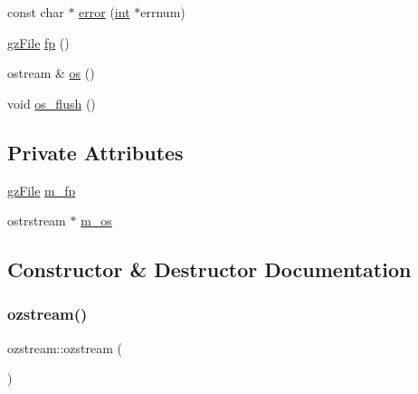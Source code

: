 \begin{DoxyCompactItemize}
\item 
const char $\ast$ \mbox{\hyperlink{classozstream_a189c85676e712ba4776bb17e1de22388}{error}} (\mbox{\hyperlink{ioapi_8h_a787fa3cf048117ba7123753c1e74fcd6}{int}} $\ast$errnum)
\item 
\mbox{\hyperlink{zlib_8h_a8e80bd9e2c359bc5bdabb2e97b4e62bf}{gz\+File}} \mbox{\hyperlink{classozstream_ab1743675ebfa7173c06f803f41844b18}{fp}} ()
\item 
ostream \& \mbox{\hyperlink{classozstream_acbbb07b71280b24534fc6e0ca8366ae2}{os}} ()
\item 
void \mbox{\hyperlink{classozstream_aa65b61b59ad9d43f3f35095cb353f57f}{os\+\_\+flush}} ()
\end{DoxyCompactItemize}
\subsection*{Private Attributes}
\begin{DoxyCompactItemize}
\item 
\mbox{\hyperlink{zlib_8h_a8e80bd9e2c359bc5bdabb2e97b4e62bf}{gz\+File}} \mbox{\hyperlink{classozstream_a1c35d36aec66a89464ce99316342999f}{m\+\_\+fp}}
\item 
ostrstream $\ast$ \mbox{\hyperlink{classozstream_a60d763f7f0d932e732c5c58d22213a53}{m\+\_\+os}}
\end{DoxyCompactItemize}


\subsection{Constructor \& Destructor Documentation}
\mbox{\label{classozstream_a5aa4b7d43f5b03e9523cf984560d46b2}} 
\subsubsection{\texorpdfstring{ozstream()}{ozstream()}\hspace{0.1cm}{\footnotesize\ttfamily [1/3]}}
{\footnotesize\ttfamily ozstream\+::ozstream (\begin{DoxyParamCaption}{ }\end{DoxyParamCaption})\hspace{0.3cm}{\ttfamily [inline]}}

\mbox{\label{classozstream_add8c121cdb4538f9f2de2d517c640e61}} 
